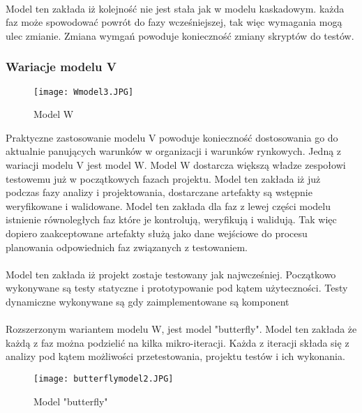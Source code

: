 \paragraph{}
Model ten zakłada iż kolejność nie jest stała jak w modelu kaskadowym. każda  faz może spowodować powrót do fazy wcześniejszej, tak więc wymagania mogą ulec zmianie. Zmiana wymgań powoduje konieczność zmiany skryptów do testów.

\subsubsection{Wariacje modelu V}
\begin{figure}[h]
\centerline{\texttt{[image: Wmodel3.JPG]}}
\caption{Model W}
\label{fig:vmodel}
\end{figure}

Praktyczne zastosowanie modelu V powoduje konieczność dostosowania go do aktualnie panujących warunków w organizacji i warunków rynkowych. Jedną z wariacji modelu V jest model W. Model W dostarcza większą władze zespołowi testowemu już w początkowych fazach projektu. Model ten zakłada iż już podczas fazy analizy i projektowania, dostarczane artefakty są wstępnie weryfikowane i walidowane. Model ten zakłada dla faz z lewej części modelu istnienie równoległych faz które je kontrolują, weryfikują i walidują. Tak więc dopiero zaakceptowane artefakty służą jako dane wejściowe do procesu planowania odpowiednich faz związanych z testowaniem.
\paragraph{}
Model ten zakłada iż projekt zostaje testowany jak najwcześniej. Początkowo wykonywane są testy statyczne i prototypowanie pod kątem użyteczności. Testy dynamiczne wykonywane są gdy zaimplementowane są komponent

\paragraph{}
Rozszerzonym wariantem modelu W, jest model "butterfly"\cite{BUTTERFLY}. Model ten zakłada że każdą z faz można podzielić na kilka mikro-iteracji. Każda z iteracji składa się z analizy pod kątem możliwości przetestowania, projektu testów i ich wykonania. 
\begin{figure}[h]
\centerline{\texttt{[image: butterflymodel2.JPG]}}
\caption{Model "butterfly"}
\label{fig:vmodel}
\end{figure}
